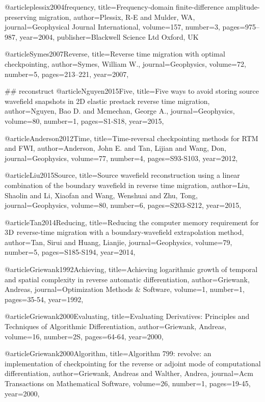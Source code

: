 {@article{plessix2004frequency,
  title={Frequency-domain finite-difference amplitude-preserving migration},
  author={Plessix, R-E and Mulder, WA},
  journal={Geophysical Journal International},
  volume={157},
  number={3},
  pages={975--987},
  year={2004},
  publisher={Blackwell Science Ltd Oxford, UK}
}

@article{Symes2007Reverse,
  title={Reverse time migration with optimal checkpointing},
  author={Symes, William W.},
  journal={Geophysics},
  volume={72},
  number={5},
  pages={213--221},
  year={2007},
}


## reconstruct
@article{Nguyen2015Five,
  title={Five ways to avoid storing source wavefield snapshots in 2D elastic prestack reverse time migration},
  author={Nguyen, Bao D. and Mcmechan, George A.},
  journal={Geophysics},
  volume={80},
  number={1},
  pages={S1-S18},
  year={2015},
}

@article{Anderson2012Time,
  title={Time-reversal checkpointing methods for {RTM} and {FWI}},
  author={Anderson, John E. and Tan, Lijian and Wang, Don},
  journal={Geophysics},
  volume={77},
  number={4},
  pages={S93-S103},
  year={2012},
}

@article{Liu2015Source,
  title={Source wavefield reconstruction using a linear combination of the boundary wavefield in reverse time migration},
  author={Liu, Shaolin and Li, Xiaofan and Wang, Wenshuai and Zhu, Tong},
  journal={Geophysics},
  volume={80},
  number={6},
  pages={S203-S212},
  year={2015},
}

@article{Tan2014Reducing,
  title={Reducing the computer memory requirement for 3$\textnormal{D}$ reverse-time migration with a boundary-wavefield extrapolation method},
  author={Tan, Sirui and Huang, Lianjie},
  journal={Geophysics},
  volume={79},
  number={5},
  pages={S185-S194},
  year={2014},
}



@article{Griewank1992Achieving,
  title={Achieving logarithmic growth of temporal and spatial complexity in reverse automatic differentiation},
  author={Griewank, Andreas},
  journal={Optimization Methods \& Software},
  volume={1},
  number={1},
  pages={35-54},
  year={1992},
}

@article{Griewank2000Evaluating,
  title={Evaluating Derivatives: Principles and Techniques of Algorithmic Differentiation},
  author={Griewank, Andreas},
  volume={16},
  number={2S},
  pages={64-64},
  year={2000},
}

@article{Griewank2000Algorithm,
  title={Algorithm 799: revolve: an implementation of checkpointing for the reverse or adjoint mode of computational differentiation},
  author={Griewank, Andreas and Walther, Andrea},
  journal={Acm Transactions on Mathematical Software},
  volume={26},
  number={1},
  pages={19-45},
  year={2000},
}

}
